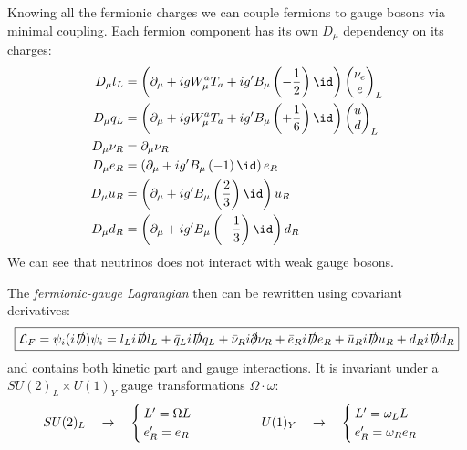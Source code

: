 \documentclass[TheoreticalPhy_ModB.tex]{subfiles}
\begin{document}
Knowing all the fermionic charges we can couple fermions to gauge bosons via minimal coupling. Each fermion component has its own $D_\mu$ dependency on its charges:
\[\begin{aligned}
D_\mu l_L &=\p{\pde\mu+igW_\mu^aT_a+ig'B_\mu\p{-\frac12}\id}\begin{pmatrix}\nu_e\\e\end{pmatrix}_L\\
D_\mu q_L &=\p{\pde\mu+igW_\mu^aT_a+ig'B_\mu\p{+\frac16}\id}\begin{pmatrix}u\\d\end{pmatrix}_L\\
D_\mu \nu_R &=\pde\mu\nu_R\\
D_\mu e_R&=\p{\pde\mu+ig'B_\mu\p{-1}\id}e_R\\
D_\mu u_R&=\p{\pde\mu+ig'B_\mu\p{\frac23}\id}u_R\\
D_\mu d_R&=\p{\pde\mu+ig'B_\mu\p{-\frac13}\id}d_R
\end{aligned}\]
We can see that neutrinos does not interact with weak gauge bosons. 

The \emph{fermionic-gauge Lagrangian} then can be rewritten using covariant derivatives:
\[\boxed{
\mathcal L_F=\bar\psi_i(i\slashed D)\psi_i
=\bar l_Li\slashed D l_L+\bar q_Li\slashed D q_L+\bar\nu_Ri\slashed\partial\nu_R+\bar e_Ri\slashed De_R+\bar u_Ri\slashed Du_R+\bar d_Ri\slashed Dd_R
}\]
and contains both kinetic part and gauge interactions.
It is invariant under a $SU(2)_L\times U(1)_Y$ gauge transformations $\Omega\cdot\omega$:
\[SU(2)_L\quad\to\quad\begin{cases}L'=\Omega L\\e_R'=e_R\end{cases}
\hspace{1.5cm}
 U(1)_Y\quad\to\quad\begin{cases}L'=\omega_L L\\e_R'=\omega_Re_R\end{cases}\]
\end{document}
